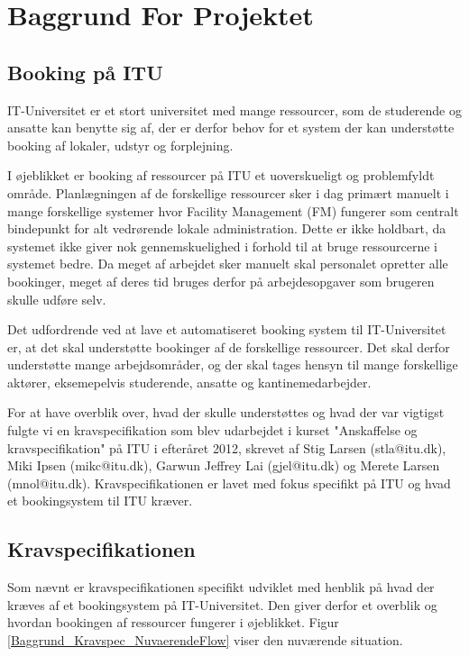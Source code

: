 \chapter{Baggrund For Projektet}
\label{Background}

\section{Booking på ITU}
\label{Background_Book}
IT-Universitet er et stort universitet med mange ressourcer, som de studerende og ansatte kan benytte sig af, der er derfor behov for et system der kan understøtte booking af lokaler, udstyr og forplejning.

I øjeblikket er booking af ressourcer på ITU et uoverskueligt og problemfyldt område. Planlægningen af de forskellige ressourcer sker i dag primært manuelt i mange forskellige systemer hvor Facility Management (FM) fungerer som centralt bindepunkt for alt vedrørende lokale administration. Dette er ikke holdbart, da systemet ikke giver nok gennemskuelighed i forhold til at bruge ressourcerne i systemet bedre. Da meget af arbejdet sker manuelt skal personalet opretter alle bookinger, meget af deres tid bruges derfor på arbejdesopgaver som brugeren skulle udføre selv. 

Det udfordrende ved at lave et automatiseret booking system til IT-Universitet er, at det skal understøtte bookinger af de forskellige ressourcer. Det skal derfor understøtte mange arbejdsområder, og der skal tages hensyn til mange forskellige aktører, eksemepelvis studerende, ansatte og kantinemedarbejder.

 For at have overblik over, hvad der skulle understøttes og hvad der var vigtigst fulgte vi en kravspecifikation som blev udarbejdet i kurset "Anskaffelse og kravspecifikation" på ITU i efteråret 2012, skrevet af Stig Larsen (stla@itu.dk), Miki Ipsen (mikc@itu.dk), Garwun Jeffrey Lai (gjel@itu.dk) og Merete Larsen (mnol@itu.dk). Kravspecifikationen er lavet med fokus specifikt på ITU og hvad et bookingsystem til ITU kræver.

\section{Kravspecifikationen}
\label{Background_Kravspec}
Som nævnt er kravspecifikationen specifikt udviklet med henblik på hvad der kræves af et bookingsystem på IT-Universitet. Den giver derfor et overblik og hvordan bookingen af ressourcer fungerer i øjeblikket. Figur \ref{Baggrund_Kravspec_NuvaerendeFlow} viser den nuværende situation.

